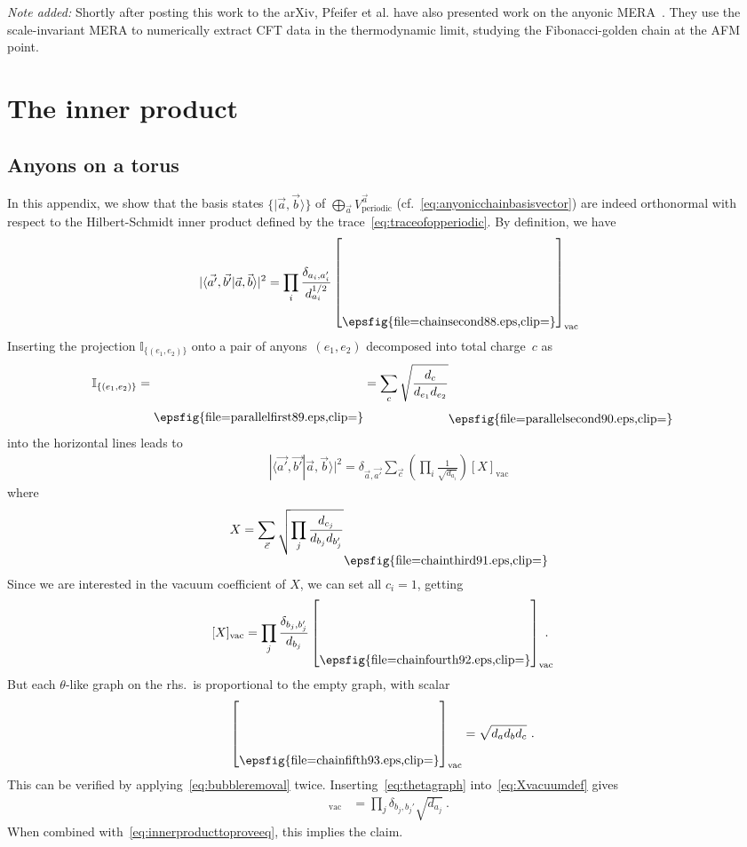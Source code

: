 \documentclass[floats,prb,twocolumn]{revtex4}
\newcommand{\id}{\mathbb{I}}
\def\id{\mathbb{I}}
\newcommand{\ket}[1]{|#1\rangle}
\newcommand*{\chainsecond}{\raisebox{-31.806pt}{\epsfig{file=chainsecond88.eps,clip=}}}
\newcommand*{\parallelfirst}{\raisebox{-27.543pt}{\epsfig{file=parallelfirst89.eps,clip=}}}
\newcommand*{\parallelsecond}{\raisebox{-28.926pt}{\epsfig{file=parallelsecond90.eps,clip=}}}
\newcommand*{\chainthird}{\raisebox{-24.663pt}{\epsfig{file=chainthird91.eps,clip=}}}
\newcommand*{\chainfourth}{\raisebox{-21.843pt}{\epsfig{file=chainfourth92.eps,clip=}}}
\newcommand*{\chainfifth}{\raisebox{-21.843pt}{\epsfig{file=chainfifth93.eps,clip=}}}
\begin{document}
\vspace{2ex}
\noindent
{\em Note added:} Shortly after posting this work to the arXiv, Pfeifer et al. have also presented work on the anyonic MERA~\cite{Pfeiferetal10}. They use the scale-invariant MERA to  numerically extract CFT data
in the thermodynamic limit, studying the Fibonacci-golden chain  at the AFM point. 
\appendix   
\section{The inner product\label{app:innproduct}}
\subsection{Anyons on a torus\label{app:periodicchain}}
In this appendix, we show that the 
basis states $\{\ket{\vec{a},\vec{b}}\}$ of $\bigoplus_{\vec{a}}V^{\vec{a}}_{\textrm{periodic}}$ (cf.~\eqref{eq:anyonicchainbasisvector}) are indeed orthonormal with respect to the Hilbert-Schmidt inner product defined by the trace~\eqref{eq:traceofopperiodic}. By definition, we have 
\begin{align*}
|\langle\vec{a'},\vec{b'}|\vec{a},\vec{b}\rangle|^2=\prod_i \frac{\delta_{a_i,a_i'}}{d_{a_i}^{1/2}}\left[\chainsecond\right]_{\textrm{vac}}
\end{align*}
Inserting the projection  $\id_{\{(e_1,e_2)\}}$  onto a pair of anyons~$(e_1,e_2)$ decomposed into total charge~$c$ as
\begin{align*}
\id_{\{(e_1,e_2)\}}&=\parallelfirst=\sum_c \sqrt{\frac{d_c}{d_{e_1}d_{e_2}}}\parallelsecond
\end{align*}
into the horizontal lines leads to 
\begin{align}
|\langle\vec{a'},\vec{b'}|\vec{a},\vec{b}\rangle|^2=\delta_{\vec{a},\vec{a'}}\sum_{\vec{c}}\left(\prod_i \frac{1}{\sqrt{d_{a_i}}}\right)\left[X\right]_{\textrm{vac}}\label{eq:innerproducttoproveeq}
\end{align}
where 
\begin{align*}
X=\sum_{\vec{c}}\sqrt{\prod_j \frac{d_{c_j}}{d_{b_j}d_{b_j'}}}\chainthird
\end{align*}
Since we are interested in the vacuum coefficient of $X$, we can set all $c_i=1$,  getting
\begin{align}
\hspace{-1ex}[X]_{\textrm{vac}}&=\prod_j\frac{\delta_{b_j,b_j'}}{d_{b_j}}\left[\chainfourth\right]_{\textrm{vac}}\hspace{-2ex}.\label{eq:Xvacuumdef}
\end{align}
But each $\theta$-like graph on the rhs.~is proportional to the empty graph, with scalar
\begin{align}
\left[\chainfifth\right]_{\textrm{vac}} &=\sqrt{d_{a}d_bd_c}\ .\label{eq:thetagraph}
\end{align}
This can be verified by applying~\eqref{eq:bubbleremoval} twice.
Inserting~\eqref{eq:thetagraph} into~\eqref{eq:Xvacuumdef} gives
\begin{align*}
[X]_{\textrm{vac}} &=\prod_{j} \delta_{b_j,b_j'} \sqrt{d_{a_j}}\ .
\end{align*}
When combined with~\eqref{eq:innerproducttoproveeq}, this implies the claim. 
\end{document}
